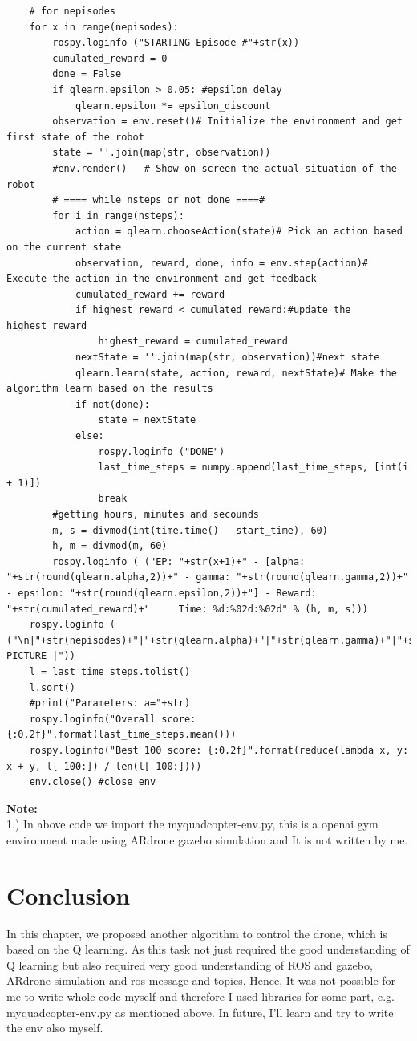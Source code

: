 \begin{verbatim}
    # for nepisodes
    for x in range(nepisodes):
        rospy.loginfo ("STARTING Episode #"+str(x))
        cumulated_reward = 0
        done = False
        if qlearn.epsilon > 0.05: #epsilon delay
            qlearn.epsilon *= epsilon_discount
        observation = env.reset()# Initialize the environment and get first state of the robot
        state = ''.join(map(str, observation))
        #env.render()   # Show on screen the actual situation of the robot
        # ==== while nsteps or not done ====#
        for i in range(nsteps):
            action = qlearn.chooseAction(state)# Pick an action based on the current state
            observation, reward, done, info = env.step(action)# Execute the action in the environment and get feedback
            cumulated_reward += reward
            if highest_reward < cumulated_reward:#update the highest_reward
                highest_reward = cumulated_reward
            nextState = ''.join(map(str, observation))#next state
            qlearn.learn(state, action, reward, nextState)# Make the algorithm learn based on the results
            if not(done):
                state = nextState
            else:
                rospy.loginfo ("DONE")
                last_time_steps = numpy.append(last_time_steps, [int(i + 1)])
                break
        #getting hours, minutes and secounds
        m, s = divmod(int(time.time() - start_time), 60)
        h, m = divmod(m, 60)
        rospy.loginfo ( ("EP: "+str(x+1)+" - [alpha: "+str(round(qlearn.alpha,2))+" - gamma: "+str(round(qlearn.gamma,2))+" - epsilon: "+str(round(qlearn.epsilon,2))+"] - Reward: "+str(cumulated_reward)+"     Time: %d:%02d:%02d" % (h, m, s)))
    rospy.loginfo ( ("\n|"+str(nepisodes)+"|"+str(qlearn.alpha)+"|"+str(qlearn.gamma)+"|"+str(initial_epsilon)+"*"+str(epsilon_discount)+"|"+str(highest_reward)+"| PICTURE |"))
    l = last_time_steps.tolist()
    l.sort()
    #print("Parameters: a="+str)
    rospy.loginfo("Overall score: {:0.2f}".format(last_time_steps.mean()))
    rospy.loginfo("Best 100 score: {:0.2f}".format(reduce(lambda x, y: x + y, l[-100:]) / len(l[-100:])))
    env.close() #close env

\end{verbatim}
\textbf{Note:}\\
1.) In above code we import the myquadcopter-env.py, this is a openai gym environment made using ARdrone gazebo simulation and It is not written by me.
\section{Conclusion}
In this chapter, we proposed another algorithm to control the drone, which is based on the Q learning. As this task not just required the good understanding of Q learning but also required very good understanding of ROS and gazebo, ARdrone simulation and ros message and topics.
Hence, It was not possible for me to write whole code myself and therefore I used libraries for some part, e.g. myquadcopter-env.py as mentioned above. In future, I'll learn and try to write the env also myself.

